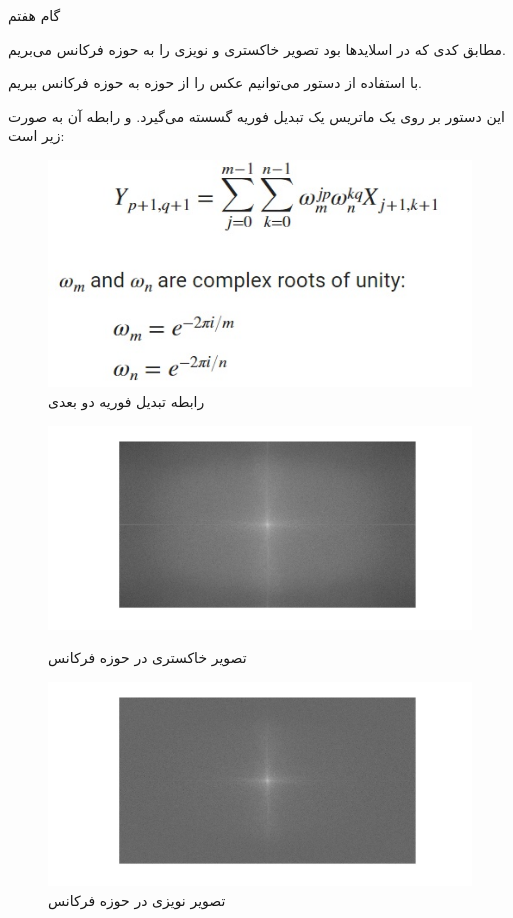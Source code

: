 \Problem
{گام هفتم}
{
    مطابق کدی که در اسلاید‌ها بود تصویر خاکستری و نویزی را به حوزه فرکانس می‌بریم.
    
    با استفاده از دستور 
    می‌توانیم عکس را از حوزه 
    به حوزه فرکانس ببریم.
    
    این دستور بر روی یک ماتریس یک تبدیل فوریه گسسته 
    می‌گیرد. و رابطه آن به صورت زیر است:
    
    \begin{figure}[H]
        \includegraphics[]{Images/FFT2.jpg}
        \centering
        \caption{رابطه تبدیل فوریه دو بعدی}
    \end{figure}
    
    \newpage
    \begin{figure}[H]
        \centering
        \begin{minipage}[b]{0.4\textwidth}
            \includegraphics[width=\textwidth]{Images/FT_gray.jpg}
            \caption{تصویر خاکستری در حوزه فرکانس}
        \end{minipage}
        \begin{minipage}[b]{0.4\textwidth}
            \includegraphics[width=\textwidth]{Images/FT_noisy.jpg}
            \caption{تصویر نویزی در حوزه فرکانس}
        \end{minipage}
    \end{figure}
    
}
